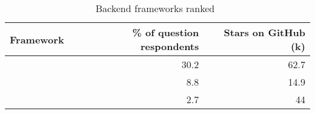 \begin{table}[ht]
\centering
\caption{Backend frameworks ranked~\parencite{mostUsedBackendFrameworks22}\protect}
\label{tab:backendFrameworksRanking}
\begin{tabular}[t]{|l|r|r|}
\toprule
Framework & \% of question respondents & Stars on GitHub (k)\\
\midrule
\cite{githubNest} & 30.2 & 62.7\\
\cite{githubFeathers} & 8.8 & 14.9\\
\cite{githubMeteor} & 2.7 & 44\\
\bottomrule
\end{tabular}
\end{table}
